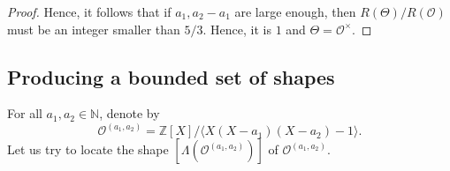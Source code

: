 \documentclass[11pt,letterpaper]{amsart}
\theoremstyle{definition}
\theoremstyle{remark}
\newcommand{\cal}[1]{\mathcal{#1}}
\newcommand{\bb}[1]{\mathbb{#1}}
\newcommand{\N}{\bb N}
\newcommand{\calO}{\cal O}
\begin{document}
\begin{proof}
		Hence, it follows that if $a_1,a_2-a_1$ are large enough, then $R(\Theta)/R(\calO)$ must be an integer smaller than $5/3$. Hence, it is $1$ and $\Theta = \calO^{\times}$.
%		
%		
%		
	\end{proof}
	
	
	\subsection{Producing a bounded set of shapes}
	
For all $a_1,a_2 \in \N$, denote by 
	\begin{equation}
		\label{eq:denote_order_a_1a_2}
		\mathcal{O}^{(a_1,a_2)} = {\mathbb{Z}[X]}/{\langle X(X-a_1)(X-a_2)-1 \rangle}.
	\end{equation}
	Let us try to locate the shape $[\Lambda(\mathcal{O}^{(a_1,a_2)})]$ of $\mathcal{O}^{(a_1,a_2)}$.
	
\end{document}
